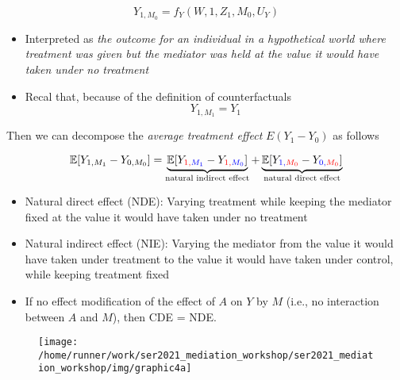 \documentclass[
  12pt,
]{book}
\providecommand{\tightlist}{%
  \setlength{\itemsep}{0pt}\setlength{\parskip}{0pt}}
\theoremstyle{definition}
\theoremstyle{definition}
\theoremstyle{definition}
\newcommand{\E}{\mathbb{E}}
\newcommand{\1}{\mathbbm{1}}
\begin{document}
\begin{equation*}
    Y_{1, M_0} = f_Y(W, 1, Z_1, M_0, U_Y)
\end{equation*}

\begin{itemize}
\item
  Interpreted as \emph{the outcome for an individual in a hypothetical world where
  treatment was given but the mediator was held at the value it would have
  taken under no treatment}
\item
  Recal that, because of the definition of counterfactuals
  \begin{equation*}
  Y_{1, M_1} = Y_1
  \end{equation*}
\end{itemize}

Then we can decompose the \emph{average treatment effect} \(E(Y_1-Y_0)\) as follows

\begin{equation*}
\E[Y_{1,M_1} - Y_{0,M_0}] = \underbrace{\E[Y_{\color{red}{1},\color{blue}{M_1}} -
    Y_{\color{red}{1},\color{blue}{M_0}}]}_{\text{natural indirect effect}} +
    \underbrace{\E[Y_{\color{blue}{1},\color{red}{M_0}} -
    Y_{\color{blue}{0},\color{red}{M_0}}]}_{\text{natural direct effect}}
\end{equation*}

\begin{itemize}
\tightlist
\item
  Natural direct effect (NDE): Varying treatment while keeping the mediator fixed at the value it would have taken under no treatment
\item
  Natural indirect effect (NIE): Varying the mediator from the value it would have taken under treatment to the value it would have taken under control, while keeping treatment fixed
\end{itemize}

\begin{itemize}
\tightlist
\item
  If no effect modification of the effect of \(A\) on \(Y\) by \(M\) (i.e., no interaction between \(A\) and \(M\)), then CDE = NDE.
\end{itemize}

\begin{figure}

{\centering \texttt{[image: /home/runner/work/ser2021\_mediation\_workshop/ser2021\_mediation\_workshop/img/graphic4a]} 

}

\end{figure}
\end{document}
